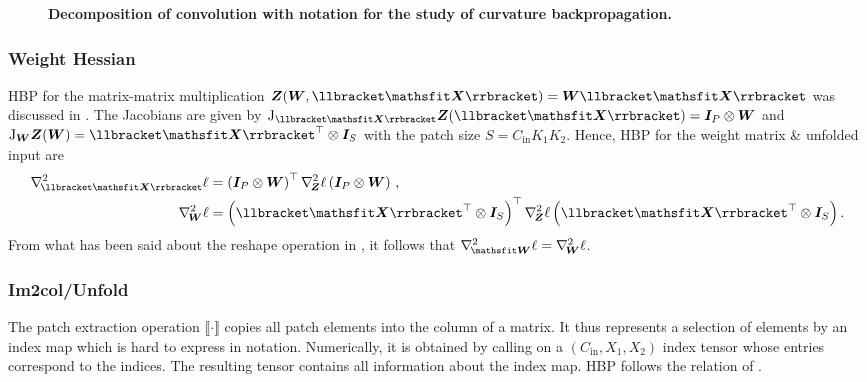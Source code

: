 \begin{figure*}[t]
  \centering \resizebox{!}{3.25cm}{
    \tikzexternalenable
    \footnotesize
    
    \tikzexternaldisable
  }
  \caption{\textbf{Decomposition of convolution with notation for the study of
      curvature backpropagation.}}
  \label{hbp::fig:convolutionSubmodules}
\end{figure*}

\subsubsection{Weight Hessian}

HBP for the matrix-matrix multiplication $\mZ(\mW, \llbracket \tX \rrbracket) =
\mW \llbracket \tX \rrbracket$ was discussed in
. The Jacobians are given by
$\jac_{\llbracket \tX \rrbracket} \mZ(\llbracket \tX \rrbracket) = \mI_P \otimes
\mW$ and $\jac_{\mW} \mZ(\mW) = \llbracket \tX \rrbracket^\top \otimes \mI_S$
with the patch size $ S = C_\text{in} K_1 K_2$. Hence, HBP for the weight matrix
\& unfolded input are
\begin{align*}
  \gradsquared{\llbracket \tX \rrbracket}\ell
  &=
    \left( \mI_P \otimes \mW \right)^\top
    \gradsquared{\mZ}\ell
    \left( \mI_P \otimes \mW \right)\,,
  \\
  \gradsquared{\mW}\ell
  &=
    \left( \llbracket \tX\rrbracket^\top \otimes \mI_S \right)^\top
    \gradsquared{\mZ}\ell
    \left( \llbracket \tX \rrbracket^\top \otimes \mI_S \right).
\end{align*}
From what has been said about the reshape operation in
, it follows that $\gradsquared{\tW}\ell =
\gradsquared{\mW}\ell$.

\subsubsection{Im2col/Unfold}

The patch extraction operation $\llbracket \cdot \rrbracket$ copies all patch
elements into the column of a matrix. It thus represents a selection of
elements by an index map which is hard to express in notation. Numerically, it
is obtained by calling  on a $(C_{\text{in}}, X_1, X_2)$
index tensor whose entries correspond to the indices. The resulting tensor
contains all information about the index map. HBP follows the relation of
.

